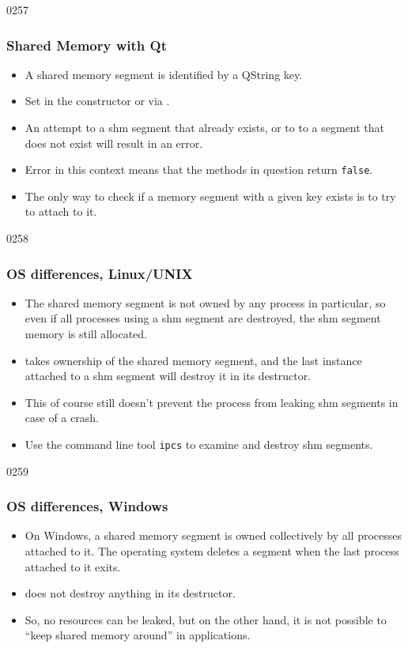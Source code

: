 \begin{slide}{0257}
\frametitle{Shared Memory with Qt}
\begin{itemize}
  \item A shared memory segment is identified by a QString key. 
  \item Set in the constructor or via .
  \item An attempt to  a shm segment that
    already exists, or to  to a segment that
    does not exist will result in an error.
  \item Error in this context means that the methods in question return \texttt{false}.
  \item The only way to check if a memory segment with a given key exists is to try to attach to it.
  \end{itemize}
\end{slide}

\begin{slide}{0258}
\frametitle{OS differences, Linux/UNIX}
  \begin{itemize}
  \item The shared memory segment is not owned by any process in particular, so even if all processes using a shm segment are destroyed, the shm segment memory is still allocated.
  \item {} takes ownership of the shared memory segment, and the last  instance attached to a shm segment will destroy it in its destructor.
  \item This of course still doesn't prevent the process from leaking shm segments in case of a crash.
  \item Use the command line tool \texttt{ipcs} to examine and destroy shm segments.
  \end{itemize}
\end{slide}


\begin{slide}{0259}
\frametitle{OS differences, Windows}
  \begin{itemize}
  \item On Windows, a shared memory segment is owned collectively by all processes attached to it. The operating system deletes a segment when the last process attached to it exits.
  \item {} does not destroy anything in its destructor.
  \item So, no resources can be leaked, but on the other hand, it is not possible to ``keep shared memory around'' in applications.
  \end{itemize}
\end{slide}

